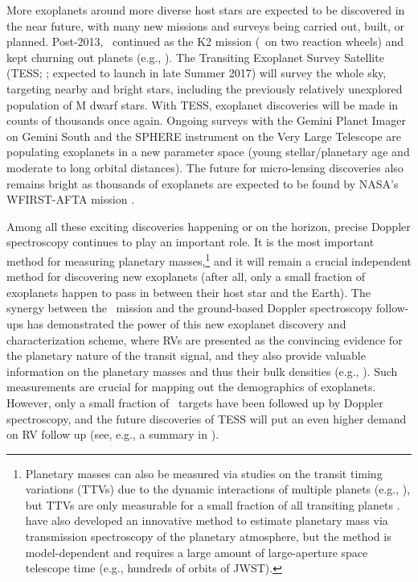More exoplanets around more diverse host stars are expected to be
discovered in the near future, with many new missions and surveys
being carried out, built, or planned. Post-2013, \kepler\ continued as
the K2 mission (\kepler\ on two reaction wheels) and kept churning out
planets (e.g., \citealt{2016ApJS..222...14V}). The Transiting
Exoplanet Survey Satellite (TESS; \citealt{2014SPIE.9143E..20R};
expected to launch in late Summer 2017) will survey the whole sky,
targeting nearby and bright stars, including the previously relatively
unexplored population of M dwarf stars. With TESS, exoplanet
discoveries will be made in counts of thousands once again. Ongoing
surveys with the Gemini Planet Imager on Gemini South
\citep{2014PNAS..11112661M} and the SPHERE instrument on the Very
Large Telescope \citep{2008SPIE.7014E..18B} are populating exoplanets
in a new parameter space (young stellar/planetary age and moderate to
long orbital distances). The future for micro-lensing discoveries also
remains bright as thousands of exoplanets are expected to be found by
NASA's WFIRST-AFTA mission \citep{2014arXiv1409.2759Y}.

Among all these exciting discoveries happening or on the horizon,
precise Doppler spectroscopy continues to play an important role. It
is the most important method for measuring planetary
masses,\footnote{Planetary masses can also be measured via studies on
the transit timing variations (TTVs) due to the dynamic interactions
of multiple planets (e.g., \citealt{2016ApJ...820...39J}), but TTVs
are only measurable for a small fraction of all transiting planets
\citep{mazeh2013}. \cite{2013Sci...342.1473D} have also developed an
innovative method to estimate planetary mass via transmission
spectroscopy of the planetary atmosphere, but the method is
model-dependent and requires a large amount of large-aperture space
telescope time (e.g., hundreds of orbits of JWST).} and it will remain
a crucial independent method for discovering new exoplanets (after
all, only a small fraction of exoplanets happen to pass in between
their host star and the Earth). The synergy between the \kepler\
mission and the ground-based Doppler spectroscopy follow-ups has
demonstrated the power of this new exoplanet discovery and
characterization scheme, where RVs are presented as the
convincing evidence for the planetary nature of the transit signal,
and they also provide valuable information on the planetary masses and
thus their bulk densities (e.g., \citealt{marcy2014}). Such
measurements are crucial for mapping out the demographics of
exoplanets. However, only a small fraction of \kepler\ targets have
been followed up by Doppler spectroscopy, and the future discoveries
of TESS will put an even higher demand on RV follow up (see, e.g.,
a summary in \citealt{exopag2015}).

